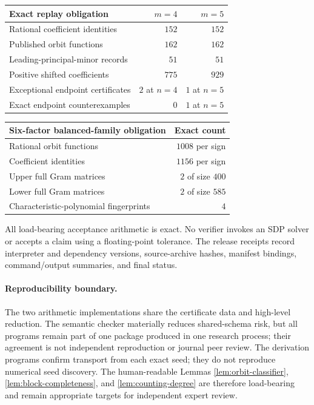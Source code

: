 \documentclass[11pt]{article}
\begin{document}
\begin{center}
\begin{tabular}{lrr}
\toprule
Exact replay obligation & \(m=4\) & \(m=5\)\\
\midrule
Rational coefficient identities & \(152\) & \(152\)\\
Published orbit functions & \(162\) & \(162\)\\
Leading-principal-minor records & \(51\) & \(51\)\\
Positive shifted coefficients & \(775\) & \(929\)\\
Exceptional endpoint certificates & \(2\) at \(n=4\) & \(1\) at \(n=5\)\\
Exact endpoint counterexamples & \(0\) & \(1\) at \(n=5\)\\
\bottomrule
\end{tabular}
\end{center}

\begin{center}
\begin{tabular}{lr}
\toprule
Six-factor balanced-family obligation & Exact count\\
\midrule
Rational orbit functions & \(1008\) per sign\\
Coefficient identities & \(1156\) per sign\\
Upper full Gram matrices & \(2\) of size \(400\)\\
Lower full Gram matrices & \(2\) of size \(585\)\\
Characteristic-polynomial fingerprints & \(4\)\\
\bottomrule
\end{tabular}
\end{center}

All load-bearing acceptance arithmetic is exact.  No verifier invokes an SDP
solver or accepts a claim using a floating-point tolerance.  The release
receipts record interpreter and dependency versions, source-archive hashes,
manifest bindings, command/output summaries, and final status.

\paragraph{Reproducibility boundary.}
The two arithmetic implementations share the certificate data and high-level
reduction.  The semantic checker materially reduces shared-schema risk, but
all programs remain part of one package produced in one research process;
their agreement is not independent reproduction or journal peer review.  The
derivation programs confirm transport from each exact seed; they do not
reproduce numerical seed discovery.  The human-readable Lemmas
\ref{lem:orbit-classifier}, \ref{lem:block-completeness}, and
\ref{lem:counting-degree} are therefore load-bearing and remain appropriate
targets for independent expert review.
\end{document}
